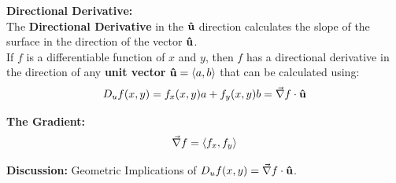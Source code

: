 \textbf{Directional Derivative:}~\\

The \textbf{Directional Derivative} in the \(\boldsymbol{\hat{\textbf{u}}}\) direction calculates the slope of the surface in the direction of the vector \(\boldsymbol{\hat{\textbf{u}}}\).\\

 If \(f\) is a differentiable function of \(x\) and \(y\), then \(f\) has a directional derivative in the direction of any \textbf{unit vector} \(\boldsymbol{\hat{\textbf{u}}} = \left\langle a,b\right\rangle\) that can be calculated using:
\[
D_u f(x,y) = f_x(x,y) a + f_y(x,y) b=  \vec{\nabla} f \cdot \boldsymbol{\hat{\textbf{u}}}\\
\]


\vspace*{.2in}

\textbf{The Gradient:}
\[
\vec{\nabla} f = \left\langle f_x,f_y\right\rangle
\]






\textbf{Discussion:} Geometric Implications of \(D_u f(x,y) = \vec{\nabla} f \cdot \boldsymbol{\hat{\textbf{u}}}\).

\vfill

\pagebreak

